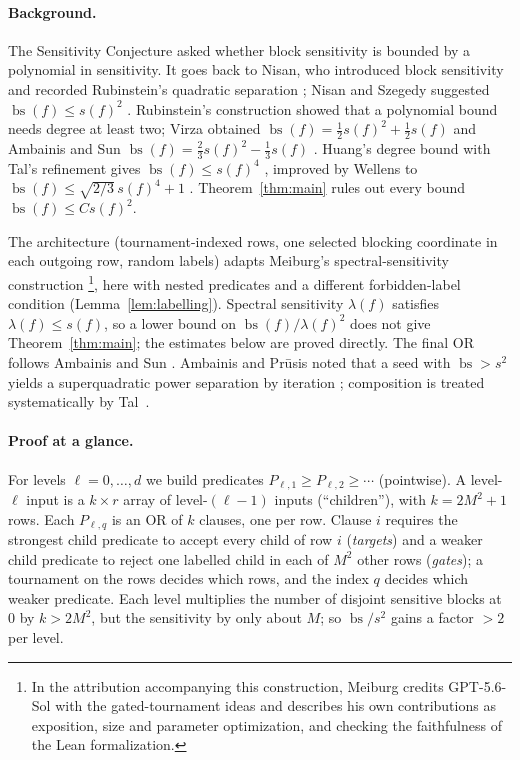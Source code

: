 \documentclass[11pt]{article}
\newcommand{\bs}{\operatorname{bs}}
\theoremstyle{definition}
\theoremstyle{remark}
\begin{document}
\paragraph{Background.}
The Sensitivity Conjecture asked whether block sensitivity is bounded by a
polynomial in sensitivity. It goes back to Nisan, who introduced block
sensitivity and recorded Rubinstein's quadratic separation
\cite[Section~2]{Nisan1989}; Nisan and Szegedy suggested
$\bs(f)\le s(f)^2$ \cite[Section~4]{NisanSzegedy1994}. Rubinstein's
construction \cite{Rubinstein1995} showed that a polynomial bound needs degree
at least two; Virza obtained $\bs(f)=\tfrac12s(f)^2+\tfrac12s(f)$
\cite{Virza2011} and Ambainis and Sun
$\bs(f)=\tfrac23s(f)^2-\tfrac13s(f)$ \cite[Theorem~1]{AmbainisSun2011}.
Huang's degree bound with Tal's refinement \cite{Tal2013} gives
$\bs(f)\le s(f)^4$ \cite[Theorem~1.5]{Huang2019}, improved by Wellens to
$\bs(f)\le\sqrt{2/3}\,s(f)^4+1$ \cite[Corollary~4.2]{Wellens2022}.
Theorem~\ref{thm:main} rules out every bound $\bs(f)\le Cs(f)^2$.

The architecture (tournament-indexed rows, one selected blocking coordinate in
each outgoing row, random labels) adapts Meiburg's spectral-sensitivity
construction \cite[Sections~3.1 and~5.2--5.5]{Meiburg2026}\footnote{In the
attribution accompanying this construction, Meiburg credits GPT-5.6-Sol
with the gated-tournament ideas and describes his own contributions as
exposition, size and parameter optimization, and checking the faithfulness
of the Lean formalization.}, here with nested predicates and a different
forbidden-label condition (Lemma~\ref{lem:labelling}). Spectral sensitivity
$\lambda(f)$ \cite{AaronsonEtAl2021} satisfies $\lambda(f)\le s(f)$, so a
lower bound on $\bs(f)/\lambda(f)^2$ does not give Theorem~\ref{thm:main};
the estimates below are proved directly. The final OR follows Ambainis and Sun
\cite[Section~4, Lemma~1]{AmbainisSun2011}. Ambainis and Pr\={u}sis noted that
a seed with $\bs>s^2$ yields a superquadratic power separation by iteration
\cite[Section~1]{AmbainisPrusis2014}; composition is treated systematically by
Tal~\cite{Tal2013}.

\paragraph{Proof at a glance.}
For levels $\ell=0,\ldots,d$ we build predicates
$P_{\ell,1}\ge P_{\ell,2}\ge\cdots$ (pointwise). A level-$\ell$ input is a
$k\times r$ array of level-$(\ell-1)$ inputs (``children''), with
$k=2M^2+1$ rows. Each $P_{\ell,q}$ is an OR of $k$ clauses, one per row.
Clause $i$ requires the strongest child predicate to accept every child of row
$i$ (\emph{targets}) and a weaker child predicate to reject one labelled child
in each of $M^2$ other rows (\emph{gates}); a tournament on the rows decides
which rows, and the index $q$ decides which weaker predicate. Each level
multiplies the number of disjoint sensitive blocks at $0$ by $k>2M^2$, but the
sensitivity by only about $M$; so $\bs/s^2$ gains a factor $>2$ per level.
\end{document}
